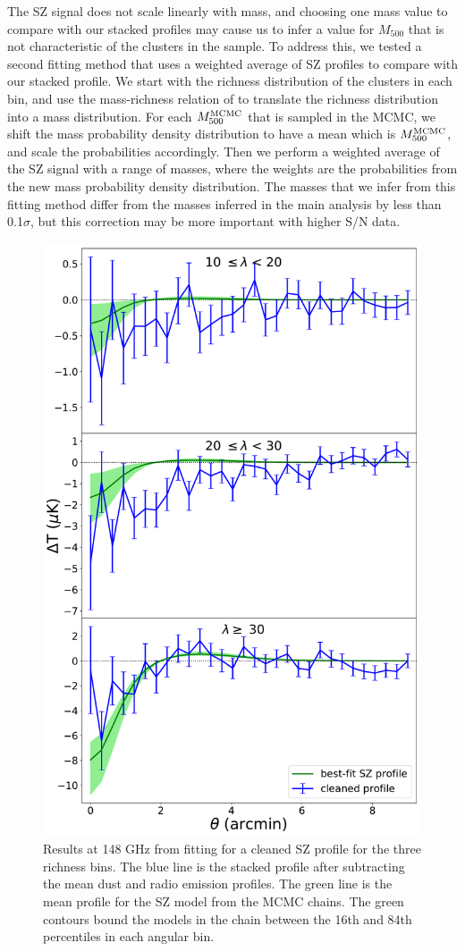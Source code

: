 \documentclass[a4paper,fleqn,usenatbib]{mnras}
\begin{document}
The SZ signal does not scale linearly with mass, and choosing one mass value to compare with our stacked profiles may cause us to infer a value for $M_{500}$ that is not characteristic of the clusters in the sample.
To address this, we tested a second fitting method that uses a weighted average of SZ profiles to compare with our stacked profile.
We start with the richness distribution of the clusters in each bin, and use the mass-richness relation of \cite{2015MNRAS.454.2305S} to translate the richness distribution into a mass distribution. 
For each $M_{500}^{\rm MCMC}$ that is sampled in the MCMC, we shift the mass probability density distribution to have a mean which is $M_{500}^{\rm MCMC}$, and scale the probabilities accordingly. 
Then we perform a weighted average of the SZ signal with a range of masses, where the weights are the probabilities from the new mass probability density distribution.
The masses that we infer from this fitting method differ from the masses inferred in the main analysis by less than 0.1$\sigma$, but this correction may be more important with higher S/N data.




\begin{figure}
  \centering
  \includegraphics[width=0.5 \textwidth]{MLprof_ncut_all_20190123.pdf}
  \caption{Results at 148 GHz from fitting for a cleaned SZ profile for the three richness bins. The blue line is the stacked profile after subtracting the mean dust and radio emission profiles. The green line is the mean profile for the SZ model from the MCMC chains. The green contours bound the models in the chain between the 16th and 84th percentiles in each angular bin.}
  \label{fig:mcmcprof}
\end{figure}
\end{document}
